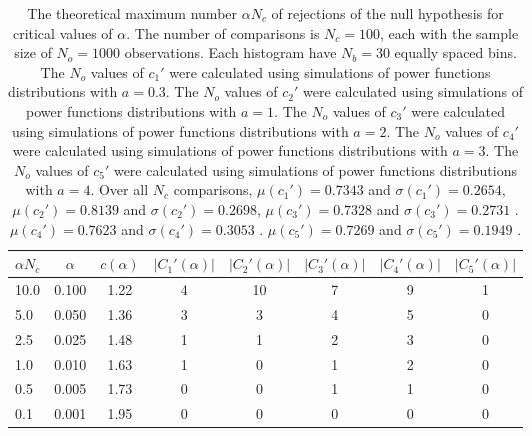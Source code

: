 \begin{table}[!h]
\begin{center}
\begin{tabular}{| l | c | c | c | c | c | c | c |}\hline
$\alpha N_c$ & $\alpha$ & $c(\alpha)$ & $|C_1'(\alpha)|$ & $|C_2'(\alpha)|$ & $|C_3'(\alpha)|$ & $|C_4'(\alpha)|$ & $|C_5'(\alpha)|$ \\\hline
10.0 & 0.100 & 1.22 & 4 & 10 & 7 & 9 & 1 \\\hline
5.0 & 0.050 & 1.36 & 3 & 3 & 4 & 5 & 0 \\\hline
2.5 & 0.025 & 1.48 & 1 & 1 & 2 & 3 & 0 \\\hline
1.0 & 0.010 & 1.63 & 1 & 0 & 1 & 2 & 0 \\\hline
0.5 & 0.005 & 1.73 & 0 & 0 & 1 & 1 & 0 \\\hline
0.1 & 0.001 & 1.95 & 0 & 0 & 0 & 0 & 0 \\\hline
\end{tabular}
\caption{The theoretical maximum number $\alpha N_c$ of rejections
of the null hypothesis for critical values of $\alpha$.
The number of comparisons is $N_c=100$,
each with the sample size of $N_o=1000$ observations.
Each histogram have $N_b=30$ equally spaced bins.
The $N_o$ values of $c_1'$ were calculated using simulations of
 power functions distributions with $a=0.3$.
The $N_o$ values of $c_2'$ were calculated using simulations of
 power functions distributions with $a=1$.
The $N_o$ values of $c_3'$ were calculated using simulations of
 power functions distributions with $a=2$.
The $N_o$ values of $c_4'$ were calculated using simulations of
 power functions distributions with $a=3$.
The $N_o$ values of $c_5'$ were calculated using simulations of
 power functions distributions with $a=4$.
Over all $N_c$ comparisons,
 $\mu(c_1')=0.7343$ and $\sigma(c_1')=0.2654$,
 $\mu(c_2')=0.8139$ and $\sigma(c_2')=0.2698$,
 $\mu(c_3')=0.7328$ and $\sigma(c_3')=0.2731$ .
 $\mu(c_4')=0.7623$ and $\sigma(c_4')=0.3053$ .
 $\mu(c_5')=0.7269$ and $\sigma(c_5')=0.1949$ .
}
\end{center}
\end{table}
